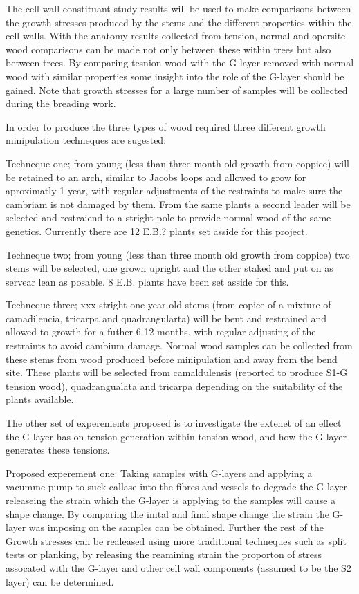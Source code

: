 \documentclass{article}
\begin{document}
The cell wall constituant study results will be used to make comparisons between
the growth stresses produced by the stems and the different properties within
the cell walls. With the anatomy results collected from tension, normal and
opersite wood comparisons can be made not only between these within trees but
also between trees. By comparing tesnion wood with the G-layer removed with
normal wood with similar properties some insight into the role of the G-layer
should be gained. Note that growth stresses for a large number of samples will
be collected during the breading work.

In order to produce the three types of wood required three different growth
minipulation techneques are sugested:

Techneque one; from young (less than three month old growth from coppice) will
be retained to an arch, similar to Jacobs loops and allowed to grow for
aproximatly 1 year, with regular adjustments of the restraints to make sure the
cambriam is not damaged by them. From the same plants a second leader will
be selected and restraiend to a stright pole to provide normal wood of the same
genetics. Currently there are 12 E.B.? plants set asside for this project.

Techneque two; from young (less than three month old growth from coppice) two
stems will be selected, one grown upright and the other staked and put on
as servear lean as posable. 8 E.B. plants have been set asside for this.

Techneque three; xxx stright one year old stems (from copice of a mixture of
camadilencia, tricarpa and quadrangularta) will be bent and restrained and
allowed to growth for a futher 6-12 months, with regular adjusting of the
restraints to avoid cambium damage. Normal wood samples can be collected from
these stems from wood produced before minipulation and away from the bend site.
These plants will be selected from camaldulensis (reported to produce S1-G
tension wood), quadrangualata and tricarpa depending on the suitability of the
plants available.

The other set of experements proposed is to investigate the extenet of an effect
the G-layer has on tension generation within tension wood, and how the G-layer
generates these tensions.

Proposed experement one:
Taking samples with G-layers and applying a vacumme pump to suck callase into
the fibres and vessels to degrade the G-layer releaseing the strain which the
G-layer is applying to the samples will cause a shape change. By comparing the
inital and final shape change the strain the G-layer was imposing on the samples
can be obtained. Further the rest of the Growth stresses can be realeased using
more traditional techneques such as split tests or planking, by releasing the
reamining strain the proporton of stress assocated with the G-layer and other
cell wall components (assumed to be the S2 layer) can be determined.
\end{document}
